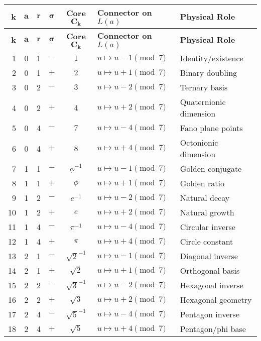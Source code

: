 \documentclass[pdflatex,sn-mathphys-num]{sn-jnl}
\theoremstyle{thmstyleone}
\theoremstyle{thmstyletwo}
\theoremstyle{thmstylethree}
\begin{document}
\begin{longtable}{@{}r c c c c l l@{}}
\toprule
\textbf{k} & \(\boldsymbol{a}\) & \(\boldsymbol{r}\) & \(\boldsymbol{\sigma}\) & \textbf{Core \(\boldsymbol{C_k}\)} & \textbf{Connector on $L(a)$} & \textbf{Physical Role}\\
\midrule
\endfirsthead
\toprule
\textbf{k} & \(\boldsymbol{a}\) & \(\boldsymbol{r}\) & \(\boldsymbol{\sigma}\) & \textbf{Core \(\boldsymbol{C_k}\)} & \textbf{Connector on $L(a)$} & \textbf{Physical Role}\\
\midrule
\endhead

1  & 0 & 1 & $-$ & \(1\) & $u \mapsto u - 1 \pmod{7}$ & Identity/existence \\
2  & 0 & 1 & $+$ & \(2\) & $u \mapsto u + 1 \pmod{7}$ & Binary doubling \\
3  & 0 & 2 & $-$ & \(3\) & $u \mapsto u - 2 \pmod{7}$ & Ternary basis \\
4  & 0 & 2 & $+$ & \(4\) & $u \mapsto u + 2 \pmod{7}$ & Quaternionic dimension \\
5  & 0 & 4 & $-$ & \(7\) & $u \mapsto u - 4 \pmod{7}$ & Fano plane points \\
6  & 0 & 4 & $+$ & \(8\) & $u \mapsto u + 4 \pmod{7}$ & Octonionic dimension \\

7  & 1 & 1 & $-$ & \(\phi^{-1}\) & $u \mapsto u - 1 \pmod{7}$ & Golden conjugate \\
8  & 1 & 1 & $+$ & \(\phi\) & $u \mapsto u + 1 \pmod{7}$ & Golden ratio \\
9  & 1 & 2 & $-$ & \(e^{-1}\) & $u \mapsto u - 2 \pmod{7}$ & Natural decay \\
10 & 1 & 2 & $+$ & \(e\) & $u \mapsto u + 2 \pmod{7}$ & Natural growth \\
11 & 1 & 4 & $-$ & \(\pi^{-1}\) & $u \mapsto u - 4 \pmod{7}$ & Circular inverse \\
12 & 1 & 4 & $+$ & \(\pi\) & $u \mapsto u + 4 \pmod{7}$ & Circle constant \\

13 & 2 & 1 & $-$ & \(\sqrt{2}^{-1}\) & $u \mapsto u - 1 \pmod{7}$ & Diagonal inverse \\
14 & 2 & 1 & $+$ & \(\sqrt{2}\) & $u \mapsto u + 1 \pmod{7}$ & Orthogonal basis \\
15 & 2 & 2 & $-$ & \(\sqrt{3}^{-1}\) & $u \mapsto u - 2 \pmod{7}$ & Hexagonal inverse \\
16 & 2 & 2 & $+$ & \(\sqrt{3}\) & $u \mapsto u + 2 \pmod{7}$ & Hexagonal geometry \\
17 & 2 & 4 & $-$ & \(\sqrt{5}^{-1}\) & $u \mapsto u - 4 \pmod{7}$ & Pentagon inverse \\
18 & 2 & 4 & $+$ & \(\sqrt{5}\) & $u \mapsto u + 4 \pmod{7}$ & Pentagon/phi base \\


\end{longtable}
\end{document}
